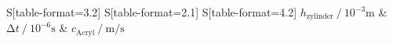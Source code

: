 \begin{table}
    \centering
    \caption{Bestimmung der Schallgeschwindigkeit mittels Impuls-Echo-Verfahren.}
    \label{tab:0}
    \begin{tabular}{
	S[table-format=3.2]
	S[table-format=2.1]
	S[table-format=4.2]
	}
	\toprule
	{$h_{\text{zylinder}} \:/\: 10^{-3} \si{\metre}$}		& {$\increment t \:/\: 10^{-6} \si{\second} $}		& 
	{$c_\text{Acryl} \:/\:\si{\metre\per\second} $}		\\ 
	\midrule
    
    \bottomrule
    \end{tabular}
    \end{table}
